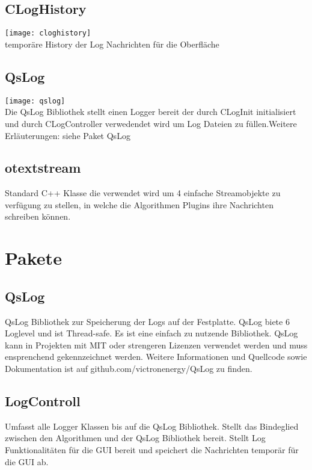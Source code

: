 \subsection{CLogHistory}\label{Logger: CLogHistory}
\texttt{[image: cloghistory]}\\
temporäre History der Log Nachrichten für die Oberfläche 
\beginMembers
{}
\closeMembers
\subsection{QsLog}\label{Logger: QsLog}
\texttt{[image: qslog]}\\
Die QsLog Bibliothek stellt einen Logger bereit der durch CLogInit initialisiert und durch CLogController verwedendet wird um Log Dateien zu füllen.Weitere Erläuterungen: siehe Paket QsLog

\subsection{otextstream}\label{Logger: otextstream}
Standard C++ Klasse die verwendet wird um 4 einfache Streamobjekte zu verfügung zu stellen, in welche die Algorithmen Plugins ihre Nachrichten schreiben können.
\section{Pakete}
\subsection{QsLog}
QsLog Bibliothek zur Speicherung der Logs auf der Festplatte.
QsLog biete 6 Loglevel und ist Thread-safe. Es ist eine einfach zu nutzende Bibliothek.
QsLog kann in Projekten mit MIT oder strengeren Lizenzen verwendet werden und muss ensprenchend gekennzeichnet werden.
Weitere Informationen und Quellcode sowie Dokumentation ist auf github.com/victronenergy/QsLog zu finden.
\subsection{LogControll}
Umfasst alle Logger Klassen bis auf die QsLog Bibliothek.
Stellt das Bindeglied zwischen den Algorithmen und der QsLog Bibliothek bereit.
Stellt Log Funktionalitäten für die GUI bereit und speichert die Nachrichten temporär für die GUI ab.
